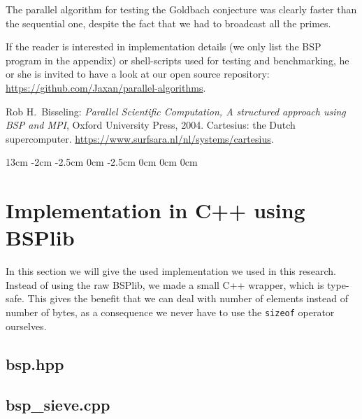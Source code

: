 \documentclass{article}
\begin{document}
The parallel algorithm for testing the Goldbach conjecture was clearly faster than the sequential one, despite the fact that we had to broadcast all the primes.

If the reader is interested in implementation details (we only list the BSP program in the appendix) or shell-scripts used for testing and benchmarking, he or she is invited to have a look at our open source repository: \url{https://github.com/Jaxan/parallel-algorithms}.

{}
\begin{thebibliography}{1}
	 Rob H.~Bisseling: \emph{Parallel Scientific Computation, A structured approach using BSP and MPI}, Oxford University Press, 2004.
	 Cartesius: the Dutch supercomputer. \url{https://www.surfsara.nl/nl/systems/cartesius}.
\end{thebibliography}


\cleardoublepage
\pagestyle{empty}
\begin{landscape}
	\begin{changepage}{5cm}   {13cm}   {-2cm}      {-2.5cm}      {0cm}     {-2.5cm}      {0cm}     {0cm}     {0cm}
		\appendix
		\section{Implementation in C++ using BSPlib}
		In this section we will give the used implementation we used in this research. Instead of using the raw BSPlib, we made a small C++ wrapper, which is type-safe. This gives the benefit that we can deal with number of elements instead of number of bytes, as a consequence we never have to use the \texttt{sizeof} operator ourselves.
		
		\subsection{bsp.hpp}
		
		
		\clearpage
		\subsection{bsp\_sieve.cpp}
		
		\clearpage
	\end{changepage}
\end{landscape}
\end{document}
